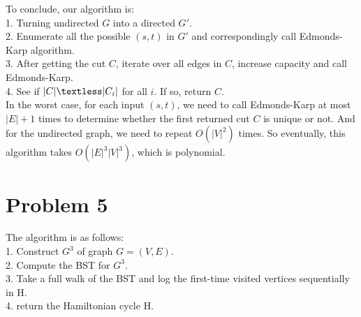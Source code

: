 \documentclass[titlepage, paper=a4, fontsize=11pt]{scrartcl} %
\numberwithin{equation}{section} %
\numberwithin{figure}{section} %
\numberwithin{table}{section} %
\begin{document}
To conclude, our algorithm is: \\
1. Turning undirected $G$ into a directed $G'$. \\
2. Enumerate all the possible $(s, t)$ in $G'$ and correspondingly call Edmonds-Karp algorithm. \\
3. After getting the cut $C$, iterate over all edges in $C$, increase capacity and call Edmonds-Karp. \\
4. See if $|C| \textless |C_i|$ for all $i$. If so, return $C$. \\

In the worst case, for each input $(s, t)$, we need to call Edmonds-Karp at most $|E|+1$ times to determine whether the first returned cut $C$ is unique or not. And for the undirected graph, we need to repeat $O(|V|^2)$ times. So eventually, this algorithm takes $O(|E|^3|V|^3)$, which is polynomial. \\




\section*{Problem 5}
The algorithm is as follows: \\
1. Construct $G^3$ of graph $G = (V, E)$. \\
2. Compute the BST for $G^3$. \\
3. Take a full walk of the BST and log the first-time visited vertices sequentially in H. \\
4. return the Hamiltonian cycle H. \\
\end{document}
